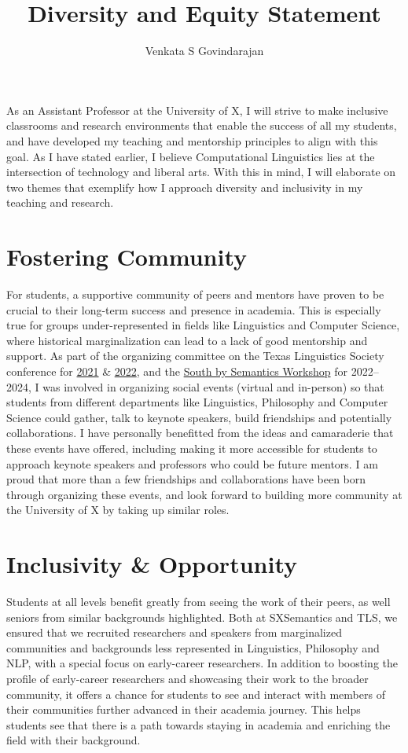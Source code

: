 \documentclass[11pt, letterpaper]{practical-report}
\title[]{Diversity and Equity Statement}
\author{Venkata S Govindarajan}
\date{}
\begin{document}
\maketitle
\thispagestyle{empty}

As an Assistant Professor at the University of X, I will strive to make inclusive classrooms and research environments that enable the success of all my students, and have developed my teaching and mentorship principles to align with this goal. As I have stated earlier, I believe Computational Linguistics lies at the intersection of technology and liberal arts. With this in mind, I will elaborate on two themes that exemplify how I approach diversity and inclusivity in my teaching and research.

\section*{Fostering Community}

For students, a supportive community of peers and mentors have proven to be crucial to their long-term success and presence in academia. This is especially true for groups under-represented in fields like Linguistics and Computer Science, where historical marginalization can lead to a lack of good mentorship and support. As part of the organizing committee on the Texas Linguistics Society conference for \href{http://tls.ling.utexas.edu/2021/}{2021} \& \href{http://tls.ling.utexas.edu/2022/}{2022}, and the \href{http://sites.utexas.edu/sxsemantics}{South by Semantics Workshop} for 2022--2024, I was involved in organizing social events (virtual and in-person) so that students from different departments like Linguistics, Philosophy and Computer Science could gather, talk to keynote speakers, build friendships and potentially collaborations. I have personally benefitted from the ideas and camaraderie that these events have offered, including making it more accessible for students to approach keynote speakers and professors who could be future mentors. I am proud that more than a few friendships and collaborations have been born through organizing these events, and look forward to building more community at the University of X by taking up similar roles. 

\section*{Inclusivity \& Opportunity}

Students at all levels benefit greatly from seeing the work of their peers, as well seniors from similar backgrounds highlighted. Both at SXSemantics and TLS, we ensured that we recruited researchers and speakers from marginalized communities and backgrounds less represented in Linguistics, Philosophy and NLP, with a special focus on early-career researchers. In addition to boosting the profile of early-career researchers and showcasing their work to the broader community, it offers a chance for students to see and interact with members of their communities further advanced in their academia journey. This helps students see that there is a path towards staying in academia and enriching the field with their background.

\end{document}
